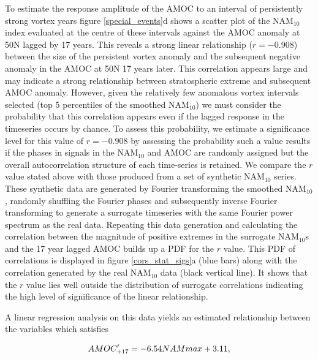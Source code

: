 To estimate the response amplitude of the AMOC to an interval of persistently strong vortex years figure \ref{special_events}d shows a scatter plot of the NAM$_{10}$ index evaluated at the centre of these intervals against the AMOC anomaly at 50N lagged by 17 years. This reveals a strong linear relationship ($r = -0.908$) between the size of the persistent vortex anomaly and the subsequent negative anomaly in the AMOC at 50N 17 years later. This correlation appears large and may indicate a strong relationship between stratospheric extreme and subsequent AMOC anomaly. However, given the relatively few anomalous vortex intervals selected (top 5 percentiles of the smoothed NAM$_{10}$) we must consider the probability that this correlation appears even if the lagged response in the timeseries occurs by chance. To assess this probability, we estimate a significance level for this value of $r = -0.908$ by assessing the probability such a value results if the phases in signals in the NAM$_{10}$ and AMOC are randomly assigned but the overall autocorrelation structure of each time-series is retained. We compare the $r$ value stated above with those produced from a set of synthetic NAM$_{10}$ series. These synthetic data are generated by Fourier transforming the smoothed NAM$_{10}$, randomly shuffling the Fourier phases and subsequently inverse Fourier transforming to generate a surrogate timeseries with the same Fourier power spectrum as the real data. Repeating this data generation and calculating the correlation between the magnitude of positive extremes in the surrogate NAM$_{10}$s and the 17 year lagged AMOC builds up a PDF for the $r$ value. This PDF of correlations is displayed in figure \ref{cors_stat_sigs}a (blue bars) along with the correlation generated by the real NAM$_{10}$ data (black vertical line). It shows that the $r$ value lies well outside the distribution of surrogate correlations indicating the high level of significance of the linear relationship.

A linear regression analysis on this data yields an estimated relationship between the variables which satisfies

\begin{equation}
AMOC'_{+17} = -6.54\space NAM max + 3.11,
\end{equation}

